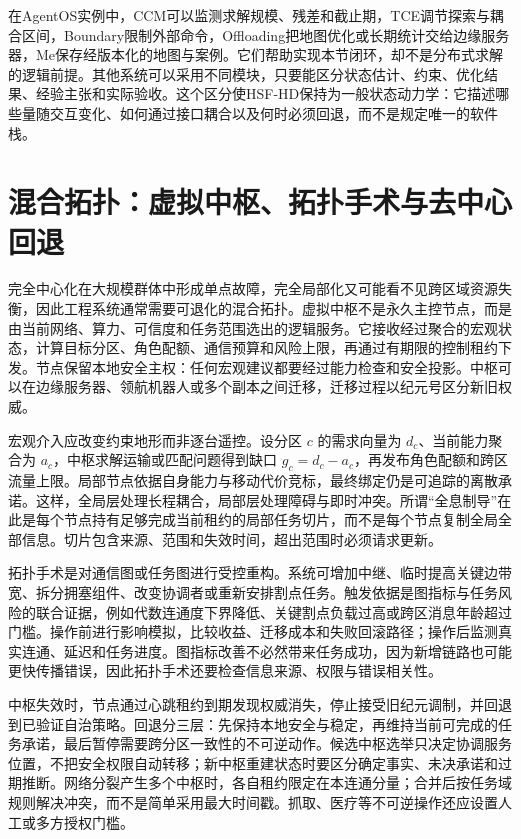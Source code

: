 在AgentOS实例中，CCM可以监测求解规模、残差和截止期，TCE调节探索与耦合区间，Boundary限制外部命令，Offloading把地图优化或长期统计交给边缘服务器，Me保存经版本化的地图与案例。它们帮助实现本节闭环，却不是分布式求解的逻辑前提。其他系统可以采用不同模块，只要能区分状态估计、约束、优化结果、经验主张和实际验收。这个区分使HSF-HD保持为一般状态动力学：它描述哪些量随交互变化、如何通过接口耦合以及何时必须回退，而不是规定唯一的软件栈。

\section{混合拓扑：虚拟中枢、拓扑手术与去中心回退}
\label{sec:hybrid_topology_enhancement}

完全中心化在大规模群体中形成单点故障，完全局部化又可能看不见跨区域资源失衡，因此工程系统通常需要可退化的混合拓扑。虚拟中枢不是永久主控节点，而是由当前网络、算力、可信度和任务范围选出的逻辑服务。它接收经过聚合的宏观状态，计算目标分区、角色配额、通信预算和风险上限，再通过有期限的控制租约下发。节点保留本地安全主权：任何宏观建议都要经过能力检查和安全投影。中枢可以在边缘服务器、领航机器人或多个副本之间迁移，迁移过程以纪元号区分新旧权威。

宏观介入应改变约束地形而非逐台遥控。设分区 $c$ 的需求向量为 $d_c$、当前能力聚合为 $a_c$，中枢求解运输或匹配问题得到缺口 $g_c=d_c-a_c$，再发布角色配额和跨区流量上限。局部节点依据自身能力与移动代价竞标，最终绑定仍是可追踪的离散承诺。这样，全局层处理长程耦合，局部层处理障碍与即时冲突。所谓“全息制导”在此是每个节点持有足够完成当前租约的局部任务切片，而不是每个节点复制全局全部信息。切片包含来源、范围和失效时间，超出范围时必须请求更新。

拓扑手术是对通信图或任务图进行受控重构。系统可增加中继、临时提高关键边带宽、拆分拥塞组件、改变协调者或重新安排割点任务。触发依据是图指标与任务风险的联合证据，例如代数连通度下界降低、关键割点负载过高或跨区消息年龄超过门槛。操作前进行影响模拟，比较收益、迁移成本和失败回滚路径；操作后监测真实连通、延迟和任务进度。图指标改善不必然带来任务成功，因为新增链路也可能更快传播错误，因此拓扑手术还要检查信息来源、权限与错误相关性。

中枢失效时，节点通过心跳租约到期发现权威消失，停止接受旧纪元调制，并回退到已验证自治策略。回退分三层：先保持本地安全与稳定，再维持当前可完成的任务承诺，最后暂停需要跨分区一致性的不可逆动作。候选中枢选举只决定协调服务位置，不把安全权限自动转移；新中枢重建状态时要区分确定事实、未决承诺和过期推断。网络分裂产生多个中枢时，各自租约限定在本连通分量；合并后按任务域规则解决冲突，而不是简单采用最大时间戳。抓取、医疗等不可逆操作还应设置人工或多方授权门槛。

